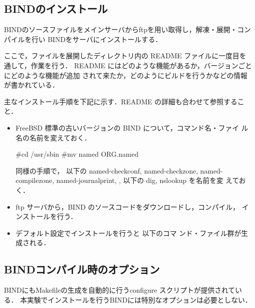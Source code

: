 \subsection{BINDのインストール}
BINDのソースファイルをメインサーバからftpを用い取得し，解凍・展開・コンパイルを行い
BINDをサーバにインストールする．

ここで，ファイルを展開したディレクトリ内の README ファイルに一度目を通して，作業を行う．
README にはどのような機能があるか，バージョンごとにどのような機能が追加
されて来たか，どのようにビルドを行うかなどの情報が書かれている．

主なインストール手順を下記に示す．README の詳細も合わせて参照すること．
\begin{itemize}
 \item FreeBSD 標準の古いバージョンの BIND について，コマンド名・ファイ
       ル名の名前を変えておく．
\begin{cli}
#cd /usr/sbin
#mv named ORG.named
\end{cli}
       同様の手順で， 以下の named-checkconf,
       named-checkzone, named-compilezone, named-journalprint,
       ,  以下の dig, nslookup を名前を変
       えておく．
 \item ftp サーバから，BIND のソースコードをダウンロードし，コンパイル，
       インストールを行う．
 \item デフォルト設定でインストールを行うと  以下のコマ
       ンド・ファイル群が生成される．
\end{itemize}

\subsection*{BINDコンパイル時のオプション}
BINDにもMakefileの生成を自動的に行うconfigure スクリプトが提供されている．
本実験でインストールを行うBINDには特別なオプションは必要としない．
